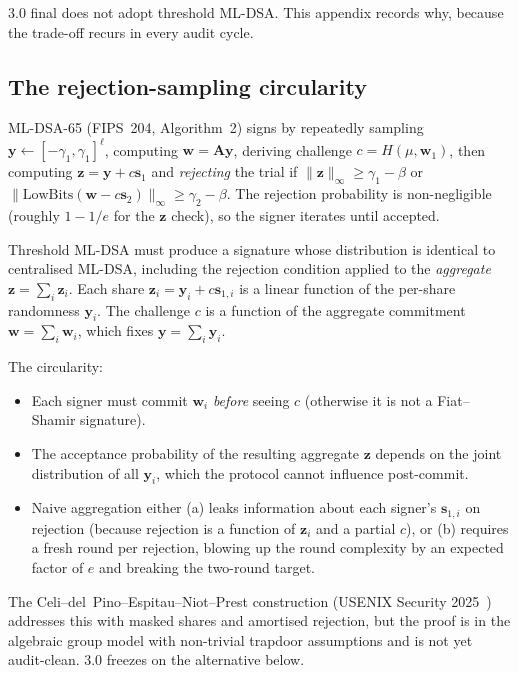 \documentclass[11pt]{article}
\begin{document}
3.0 final does not adopt threshold ML-DSA.  This appendix records why,
because the trade-off recurs in every audit cycle.

\subsection{The rejection-sampling circularity}

ML-DSA-65 (FIPS~204, Algorithm~2) signs by repeatedly sampling
$\mathbf{y} \leftarrow [-\gamma_1, \gamma_1]^\ell$, computing
$\mathbf{w} = \mathbf{A}\mathbf{y}$, deriving challenge
$c = H(\mu, \mathbf{w}_1)$, then computing $\mathbf{z} =
\mathbf{y} + c \mathbf{s}_1$ and \emph{rejecting} the trial if
$\|\mathbf{z}\|_\infty \geq \gamma_1 - \beta$ or
$\|\text{LowBits}(\mathbf{w} - c\mathbf{s}_2)\|_\infty \geq \gamma_2 -
\beta$.  The rejection probability is non-negligible (roughly $1 - 1/e$
for the $\mathbf{z}$ check), so the signer iterates until accepted.

Threshold ML-DSA must produce a signature whose distribution is
identical to centralised ML-DSA, including the rejection condition
applied to the \emph{aggregate} $\mathbf{z} = \sum_i \mathbf{z}_i$.
Each share $\mathbf{z}_i = \mathbf{y}_i + c \mathbf{s}_{1,i}$ is a
linear function of the per-share randomness $\mathbf{y}_i$.  The
challenge $c$ is a function of the aggregate commitment
$\mathbf{w} = \sum_i \mathbf{w}_i$, which fixes
$\mathbf{y} = \sum_i \mathbf{y}_i$.

The circularity:
\begin{itemize}[nosep]
  \item Each signer must commit $\mathbf{w}_i$ \emph{before} seeing
    $c$ (otherwise it is not a Fiat--Shamir signature).
  \item The acceptance probability of the resulting aggregate
    $\mathbf{z}$ depends on the joint distribution of all
    $\mathbf{y}_i$, which the protocol cannot influence post-commit.
  \item Naive aggregation either (a) leaks information about each
    signer's $\mathbf{s}_{1,i}$ on rejection (because rejection is a
    function of $\mathbf{z}_i$ and a partial $c$), or (b) requires a
    fresh round per rejection, blowing up the round complexity by an
    expected factor of $e$ and breaking the two-round target.
\end{itemize}

The Celi--del~Pino--Espitau--Niot--Prest construction
(USENIX Security 2025~\cite{tmldsa2025}) addresses this with masked
shares and amortised rejection, but the proof is in the algebraic
group model with non-trivial trapdoor assumptions and is not yet
audit-clean.  3.0 freezes on the alternative below.
\end{document}
